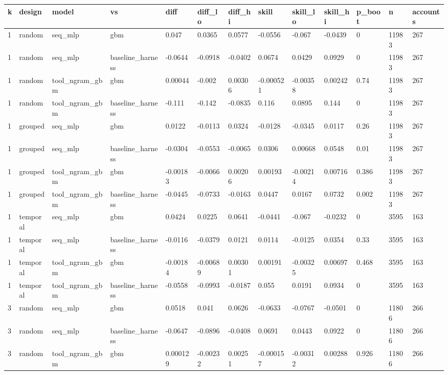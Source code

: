 \begin{tabular}{lllllllllllll}
\toprule
k & design & model & vs & diff & diff\_lo & diff\_hi & skill & skill\_lo & skill\_hi & p\_boot & n & accounts \\
\midrule
1 & random & seq\_mlp & gbm & 0.047 & 0.0365 & 0.0577 & -0.0556 & -0.067 & -0.0439 & 0 & 11983 & 267 \\
1 & random & seq\_mlp & baseline\_harness & -0.0644 & -0.0918 & -0.0402 & 0.0674 & 0.0429 & 0.0929 & 0 & 11983 & 267 \\
1 & random & tool\_ngram\_gbm & gbm & 0.00044 & -0.002 & 0.00306 & -0.000521 & -0.00358 & 0.00242 & 0.74 & 11983 & 267 \\
1 & random & tool\_ngram\_gbm & baseline\_harness & -0.111 & -0.142 & -0.0835 & 0.116 & 0.0895 & 0.144 & 0 & 11983 & 267 \\
1 & grouped & seq\_mlp & gbm & 0.0122 & -0.0113 & 0.0324 & -0.0128 & -0.0345 & 0.0117 & 0.26 & 11983 & 267 \\
1 & grouped & seq\_mlp & baseline\_harness & -0.0304 & -0.0553 & -0.0065 & 0.0306 & 0.00668 & 0.0548 & 0.01 & 11983 & 267 \\
1 & grouped & tool\_ngram\_gbm & gbm & -0.00183 & -0.0066 & 0.00206 & 0.00193 & -0.00214 & 0.00716 & 0.386 & 11983 & 267 \\
1 & grouped & tool\_ngram\_gbm & baseline\_harness & -0.0445 & -0.0733 & -0.0163 & 0.0447 & 0.0167 & 0.0732 & 0.002 & 11983 & 267 \\
1 & temporal & seq\_mlp & gbm & 0.0424 & 0.0225 & 0.0641 & -0.0441 & -0.067 & -0.0232 & 0 & 3595 & 163 \\
1 & temporal & seq\_mlp & baseline\_harness & -0.0116 & -0.0379 & 0.0121 & 0.0114 & -0.0125 & 0.0354 & 0.33 & 3595 & 163 \\
1 & temporal & tool\_ngram\_gbm & gbm & -0.00184 & -0.00689 & 0.00301 & 0.00191 & -0.00325 & 0.00697 & 0.468 & 3595 & 163 \\
1 & temporal & tool\_ngram\_gbm & baseline\_harness & -0.0558 & -0.0993 & -0.0187 & 0.055 & 0.0191 & 0.0934 & 0 & 3595 & 163 \\
3 & random & seq\_mlp & gbm & 0.0518 & 0.041 & 0.0626 & -0.0633 & -0.0767 & -0.0501 & 0 & 11806 & 266 \\
3 & random & seq\_mlp & baseline\_harness & -0.0647 & -0.0896 & -0.0408 & 0.0691 & 0.0443 & 0.0922 & 0 & 11806 & 266 \\
3 & random & tool\_ngram\_gbm & gbm & 0.000129 & -0.00232 & 0.00251 & -0.000157 & -0.00312 & 0.00288 & 0.926 & 11806 & 266 \\

\end{tabular}

